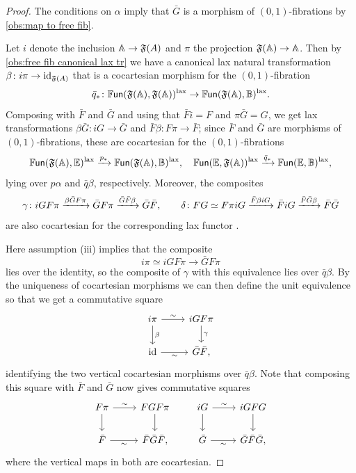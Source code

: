 \documentclass[a4paper,11pt]{article}
\newcommand{\FFr}{\mathfrak{F}}
\begin{document}
\begin{proof}
  The conditions on $\alpha$ imply that $\bar{G}$ is a morphism of
  $(0,1)$-fibrations by \cref{obs:map to free fib}.

  Let $i$ denote the inclusion $\tA \to \FFr(A)$ and $\pi$ the
  projection $\FFr(\tA) \to \tA$. Then by \cref{obs:free fib canonical
    lax tr} we have a canonical lax natural transformation
  $\beta \colon i \pi \to \id_{\FFr(A)}$ that is a cocartesian morphism for the
  $(0,1)$-fibration
  \[ \bar{q}_{*} \colon
    \FUN(\FFr(\tA),\FFr(\tA))^{\lax} \to
    \FUN(\FFr(\tA), \tB)^{\lax}.\] Composing with $\bar{F}$
  and $\bar{G}$ and using that $\bar{F}i = F$ and $\pi \bar{G} = G$,
  we get lax transformations $\beta \bar{G} \colon iG \to \bar{G}$ and
  $\bar{F} \beta \colon F \pi \to \bar{F}$; since $\bar{F}$ and
  $\bar{G}$ are morphisms of $(0,1)$-fibrations, these are cocartesian for the $(0,1)$-fibrations
  \[  \FUN(\FFr(\tA), \tE)^{\lax} \xto{p_{*}} \FUN(\FFr(\tA),
    \tB)^{\lax}, \quad \FUN(\tE, \FFr(\tA))^{\lax} \xto{\bar{q}_{*}} \FUN(\tE, \tB)^{\lax}, \]
  lying over $p\alpha$ and $\bar{q}\beta$, respectively. Moreover, the
  composites
  \[ \gamma \colon iGF\pi \xto{\beta\bar{G} F\pi} \bar{G}F\pi
    \xto{\bar{G}\bar{F}\beta} \bar{G}\bar{F},\qquad
     \delta \colon FG \simeq F\pi i G \xto{\bar{F}\beta i G} \bar{F} i G
    \xto{\bar{F}\bar{G}\beta} \bar{F}\bar{G} 
  \]
  are also cocartesian for the corresponding lax functor \itcats{}.

  Here assumption (iii) implies that  the composite
  \[ i\pi \simeq iGF\pi  \to \bar{G}F \pi\]
  lies over the identity, so the composite of $\gamma$ with this
  equivalence lies over
  $\bar{q}
  \beta$. By the uniqueness of cocartesian morphisms we can then
  define the unit equivalence so that we get a
  commutative square
  \[
    \begin{tikzcd}
     i\pi  \ar[r, "\sim"] \ar[d, "\beta"] & iGF\pi  \ar[d, "\gamma"] \\
     \id \ar[r, "\sim"'] & \bar{G}\bar{F},
    \end{tikzcd}
  \]
  identifying the two vertical cocartesian morphisms over
  $\bar{q}\beta$. Note that composing this square with $\bar{F}$ and $\bar{G}$ now gives commutative
  squares
  \[
    \begin{tikzcd}
     F\pi  \ar[r, "\sim"] \ar[d] & FGF\pi  \ar[d] \\
     \bar{F} \ar[r, "\sim"'] & \bar{F}\bar{G}\bar{F},
   \end{tikzcd}
   \qquad
       \begin{tikzcd}
     iG  \ar[r, "\sim"] \ar[d] & iGFG  \ar[d] \\
     \bar{G} \ar[r, "\sim"'] & \bar{G}\bar{F}\bar{G},
   \end{tikzcd}
 \]
 where the vertical maps in both are cocartesian. 


\end{proof}
\end{document}
